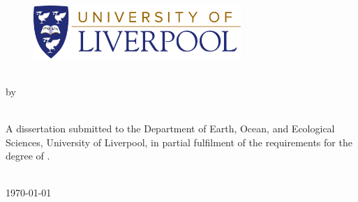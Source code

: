 

\thispagestyle{empty}

\begin{figure}[t!]
  \begin{center}
    \includegraphics[width=0.7\textwidth]{figures/university-of-liverpool-logo.pdf}
  \end{center}
\end{figure}

\vspace*{3cm}

\begin{center}
  \textbf{\LARGE \Title{}}
  \\[10mm]
  {\Large by}
  \\[10mm]
  {\Large \Name}
  \\
  \vfill
  \begin{minipage}[t]{0.7\textwidth}
    A dissertation submitted to the
    Department of Earth, Ocean, and
    Ecological Sciences,
    University of Liverpool, in partial fulfilment of
    the requirements for the degree of
    \Degree{}.
  \end{minipage}
  \\[3cm]
  \monthyear\today
\end{center}
